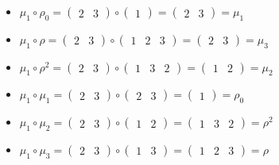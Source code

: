 \documentclass{article}
\begin{document}
\begin{itemize}
        \item $\mu_1\circ\rho_0 =\begin{pmatrix}2&3\end{pmatrix}\circ\begin{pmatrix}1\end{pmatrix}=\begin{pmatrix}2&3\end{pmatrix}=\mu_1$
        \item $\mu_1\circ\rho =\begin{pmatrix}2&3\end{pmatrix}\circ\begin{pmatrix}1&2&3\end{pmatrix}=\begin{pmatrix}2&3\end{pmatrix}=\mu_3$
        \item $\mu_1\circ\rho^2 =\begin{pmatrix}2&3\end{pmatrix}\circ\begin{pmatrix}1&3&2\end{pmatrix}=\begin{pmatrix}1&2\end{pmatrix}=\mu_2$
        \item $\mu_1\circ\mu_1 =\begin{pmatrix}2&3\end{pmatrix}\circ\begin{pmatrix}2&3\end{pmatrix}=\begin{pmatrix}1\end{pmatrix}=\rho_0$
        \item $\mu_1\circ\mu_2 =\begin{pmatrix}2&3\end{pmatrix}\circ\begin{pmatrix}1&2\end{pmatrix}=\begin{pmatrix}1&3&2\end{pmatrix}=\rho^2$
        \item $\mu_1\circ\mu_3 =\begin{pmatrix}2&3\end{pmatrix}\circ\begin{pmatrix}1&3\end{pmatrix}=\begin{pmatrix}1&2&3\end{pmatrix}=\rho$


\end{itemize}
\end{document}
